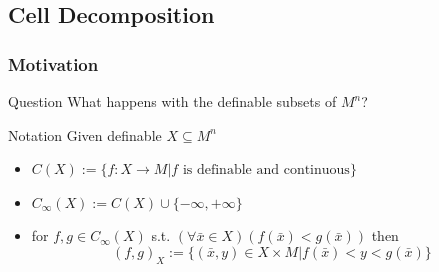 \subsection{Cell Decomposition}

\begin{frame}[c]\frametitle{Motivation}
	
	\begin{beamerboxesrounded}[shadow=true]{Question}
		What happens with the definable subsets of $M^n$?
	\end{beamerboxesrounded}
    
	\begin{beamerboxesrounded}[shadow=true]{Notation}
		Given definable $X \subseteq M^n$
		\begin{itemize}
			\item $C(X):= \{ f:X \to M|f \text{ is definable and continuous}\}$
			\item $C_\infty(X):=C(X) \cup \{ -\infty, +\infty \}$
			\item for $f,g \in C_\infty(X)$ s.t. $(\forall \bar{x} \in X)(f(\bar{x})<g(\bar{x}))$ then 
			$$(f,g)_X := \{  (\bar{x},y)\in X \times M|f(\bar{x})<y<g(\bar{x})\}$$
		\end{itemize}
	\end{beamerboxesrounded}

\end{frame}

